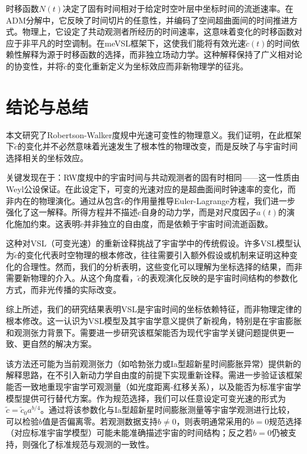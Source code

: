 \documentclass[jkps,preprint,fleqn]{revtex4}
\newcommand{\tc}{\tilde{c}}
\begin{document}
\begin{CJK*}{UTF8}{gbsn}
时移函数$N(t)$决定了固有时间相对于给定时空叶层中坐标时间的流逝速率。在ADM分解中，它反映了时间切片的任意性，并编码了空间超曲面间的时间推进方式。物理上，它设定了共动观测者所经历的时间速率，这意味着变化的时移函数对应于非平凡的时空调制。在meVSL框架下，这使我们能将有效光速$\tc(t)$的时间依赖性解释为源于时移函数的选择，而非独立场动力学。这种解释保持了广义相对论的协变性，并将$\tc$的变化重新定义为坐标效应而非新物理学的征兆。
\section{结论与总结}\label{sec:Conc}
本文研究了Robertson-Walker度规中光速可变性的物理意义。我们证明，在此框架下$\tc$的变化并不必然意味着光速发生了根本性的物理改变，而是反映了与宇宙时间选择相关的坐标效应。

关键发现在于：RW度规中的宇宙时间与共动观测者的固有时相同——这一性质由Weyl公设保证。在此设定下，可变的光速对应的是超曲面间时钟速率的变化，而非内在的物理演化。通过从包含$\tc$的作用量推导Euler-Lagrange方程，我们进一步强化了这一解释。所得方程并不描述$c$自身的动力学，而是对尺度因子$a(t)$的演化施加约束。这表明$\tc$并非独立的自由度，而是依赖于宇宙时间流逝函数。

这种对VSL（可变光速）的重新诠释挑战了宇宙学中的传统假设。许多VSL模型认为$\tc$的变化代表时空物理的根本修改，往往需要引入额外假设或机制来证明这种变化的合理性。然而，我们的分析表明，这些变化可以理解为坐标选择的结果，而非需要新物理的介入。从这个角度看，$\tc$的表观演化反映的是宇宙时间结构的参数化方式，而非光传播的实际改变。

综上所述，我们的研究结果表明VSL是宇宙时间的坐标依赖特征，而非物理定律的根本修改。这一认识为VSL模型及其宇宙学意义提供了新视角，特别是在宇宙膨胀和观测张力背景下。需要进一步研究该框架能否为现代宇宙学关键问题提供更一致、更自然的解决方案。

该方法还可能为当前观测张力（如哈勃张力或Ia型超新星时间膨胀异常）提供新的解释思路，在不引入新动力学自由度的前提下实现重新诠释。需进一步验证该框架能否一致地重现宇宙学可观测量（如光度距离-红移关系），以及能否为标准宇宙学模型提供可行替代方案。作为规范选择，我们可以任意设定可变光速的形式为$\tc = \tc_0 a^{b/4}$。通过将该参数化与Ia型超新星时间膨胀测量等宇宙学观测进行比较，可以检验$b$值是否偏离零。若观测数据支持$b \neq 0$，则表明通常采用的$b=0$规范选择（对应标准宇宙学模型）可能未能准确描述宇宙的时间结构；反之若$b=0$仍被支持，则强化了标准规范与观测的一致性。


\end{CJK*}
\end{document}
